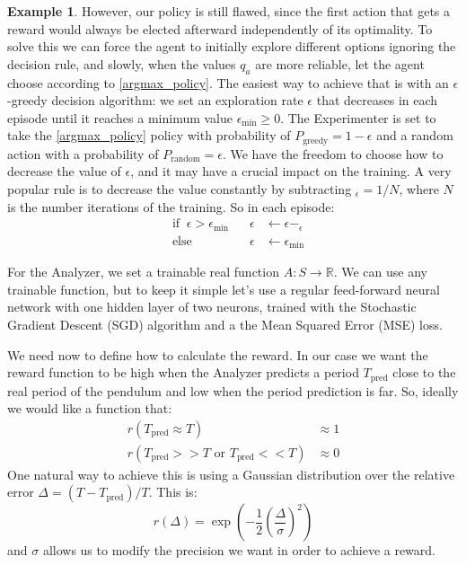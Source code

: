 \documentclass[11pt,a4paper,twoside]{report}
\newcommand{\+}{\textnormal{+} }
\theoremstyle{definition}
\newtheorem{myex}[mythm]{Example}
\numberwithin{equation}{chapter}
\begin{document}
\begin{myex}
However, our policy is still flawed, since the first action that gets a reward
would always be elected afterward independently of its optimality. To solve this
we can force the agent to initially explore different options ignoring the
decision rule, and slowly, when the values $q_a$ are more reliable, let the
agent choose according to \eqref{argmax_policy}. The easiest way to achieve that
is with an $\epsilon$-greedy decision algorithm: we set an exploration rate
$\epsilon$ that decreases in each episode until it reaches a minimum value
$\epsilon_\text{min}\geq 0$. The Experimenter is set to take the
\eqref{argmax_policy} policy with probability of $P_{\text{greedy}}=1-\epsilon$
and a random action with a probability of $P_{\text{random}}=\epsilon$. We have
the freedom to choose how to decrease the value of $\epsilon$, and it may have a
crucial impact on the training. A very popular rule is to decrease the value
constantly by subtracting $_\epsilon = 1/N$, where $N$ is the number iterations
of the training. So in each episode:
\begin{align}
  &\text{if}\; \; \epsilon > \epsilon_\text{min} \;\;\; &\epsilon&\leftarrow\epsilon - _\epsilon \\
  &\text{else} \; \;  &\epsilon &\leftarrow \epsilon_\text{min}
\end{align} 


For the Analyzer, we set a trainable real function $A: S \rightarrow
\mathbb{R}$. We can use any trainable function, but to keep it simple let's use
a regular feed-forward neural network with one hidden layer of two neurons,
trained with the Stochastic Gradient Descent (SGD) algorithm and a the Mean
Squared Error (MSE) loss.

We need now to define how to calculate the reward.  In our case we want the
reward function to be high when the Analyzer predicts a period $T_\text{pred}$
close to the real period of the pendulum and low when the period prediction is
far. So, ideally we would like a function that:
\begin{align}
       r(T_{\text{pred}} \approx T) &\approx 1\\
       r(T_{\text{pred}}>> T \text{ or } T_{\text{pred}} << T) & \approx 0
\end{align}
One natural way to achieve this is using a Gaussian distribution over the
relative error $\Delta=(T-T_{\text{pred}})/T$. This is:
\begin{equation}
   r(\Delta)=\exp\left(-\frac{1}{2}\left( \frac{\Delta}{\sigma} \right) ^2\right)
  \label{gaussian_reward}
\end{equation}
and $\sigma$ allows us to modify the precision we want in order to achieve a 
reward.


\end{myex}
\end{document}
